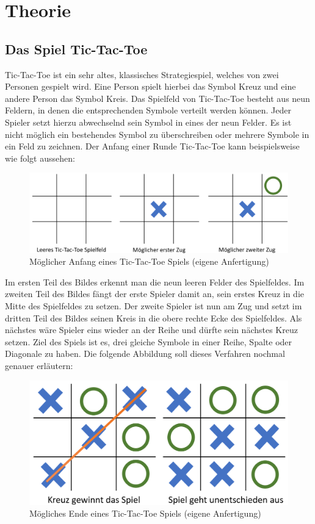 \chapter{Theorie}
\section{Das Spiel Tic-Tac-Toe}

Tic-Tac-Toe ist ein sehr altes, klassisches Strategiespiel, welches von zwei Personen gespielt wird. Eine Person
spielt hierbei das Symbol Kreuz und eine andere Person das Symbol Kreis. Das Spielfeld von Tic-Tac-Toe besteht aus
neun Feldern, in denen die entsprechenden Symbole verteilt werden können. Jeder Spieler setzt hierzu abwechselnd sein
Symbol in eines der neun Felder. Es ist nicht möglich ein bestehendes Symbol zu überschreiben oder mehrere Symbole in
ein Feld zu zeichnen. Der Anfang einer Runde Tic-Tac-Toe kann beispielsweise wie folgt aussehen:
\begin{figure}[H]
    \centering
    \includegraphics[scale=0.25]{img/tictactoe_start.png}
    \caption[Möglicher Anfang eines Tic-Tac-Toe Spiels]{Möglicher Anfang eines Tic-Tac-Toe Spiels (eigene Anfertigung)}
    \label{fig:tictactoestates}
\end{figure}
Im ersten Teil des Bildes erkennt man die neun leeren Felder des Spielfeldes. Im zweiten Teil des Bildes fängt der erste
Spieler damit an, sein erstes Kreuz in die Mitte des Spielfeldes zu setzen. Der zweite Spieler ist nun am Zug und setzt
im dritten Teil des Bildes seinen Kreis in die obere rechte Ecke des Spielfeldes. Als nächstes wäre Spieler eins wieder an
der Reihe und dürfte sein nächstes Kreuz setzen. Ziel des Spiels ist es, drei gleiche Symbole in einer Reihe, Spalte oder
Diagonale zu haben. Die folgende Abbildung soll dieses Verfahren nochmal genauer erläutern:
\begin{figure}[H]
    \centering
    \includegraphics[scale=0.25]{img/tictactoe_endings.png} 
    \caption[Mögliches Ende eines Tic-Tac-Toe Spiels]{Mögliches Ende eines Tic-Tac-Toe Spiels (eigene Anfertigung)}
\end{figure}
